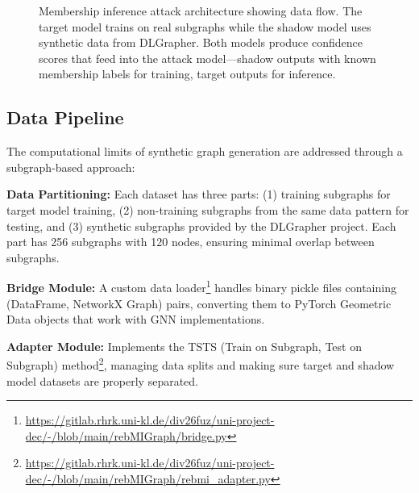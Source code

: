\documentclass{article}
\begin{document}
\begin{figure}[H]
\caption{Membership inference attack architecture showing data flow. The target model trains on real subgraphs while the shadow model uses synthetic data from DLGrapher. Both models produce confidence scores that feed into the attack model—shadow outputs with known membership labels for training, target outputs for inference.}
\label{fig:attack-architecture}
\end{figure}

\subsection{Data Pipeline}
The computational limits of synthetic graph generation are addressed through a subgraph-based approach:

\textbf{Data Partitioning:} Each dataset has three parts: (1) training subgraphs for target model training, (2) non-training subgraphs from the same data pattern for testing, and (3) synthetic subgraphs provided by the DLGrapher project. Each part has 256 subgraphs with 120 nodes, ensuring minimal overlap between subgraphs.

\textbf{Bridge Module:} A custom data loader\footnote{\url{https://gitlab.rhrk.uni-kl.de/div26fuz/uni-project-dec/-/blob/main/rebMIGraph/bridge.py}} handles binary pickle files containing (DataFrame, NetworkX Graph) pairs, converting them to PyTorch Geometric Data objects that work with GNN implementations.

\textbf{Adapter Module:} Implements the TSTS (Train on Subgraph, Test on Subgraph) method\footnote{\url{https://gitlab.rhrk.uni-kl.de/div26fuz/uni-project-dec/-/blob/main/rebMIGraph/rebmi_adapter.py}}, managing data splits and making sure target and shadow model datasets are properly separated.
\end{document}
